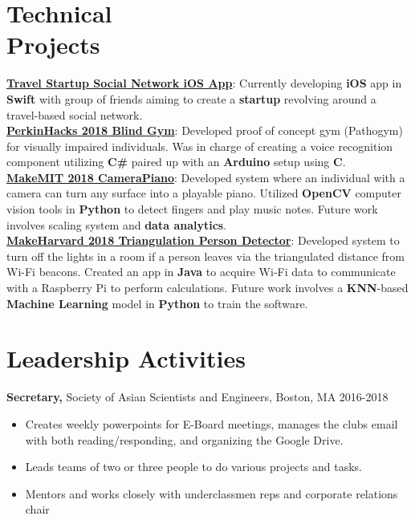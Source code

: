 \documentclass[margin]{res}
\begin{document}
\begin{resume}
\section{Technical \\ Projects} 
\textbf{\underline{Travel Startup Social Network iOS App}}: Currently developing \textbf{iOS} app in \textbf{Swift} with group of friends aiming to create a \textbf{startup} revolving around a travel-based social network. \\
\textbf{\underline{PerkinHacks 2018 Blind Gym}}: Developed proof of concept gym (Pathogym) for visually impaired individuals. Was in charge of creating a voice recognition component utilizing \textbf{C\#} paired up with an \textbf{Arduino} setup using \textbf{C}. \\
\textbf{\underline{MakeMIT 2018 CameraPiano}}: Developed system where an individual with a camera can turn any surface into a playable piano. Utilized \textbf{OpenCV} computer vision tools in \textbf{Python} to detect fingers and play music notes. Future work involves scaling system and \textbf{data analytics}.\\
\textbf{\underline{MakeHarvard 2018 Triangulation Person Detector}}: Developed system to turn off the lights in a room if a person leaves via the triangulated distance from Wi-Fi beacons. Created an app in \textbf{Java} to acquire Wi-Fi data to communicate with a Raspberry Pi to perform calculations. Future work involves a \textbf{KNN}-based \textbf{Machine Learning} model in \textbf{Python} to train the software. \\

			
			
			
			
			
\section{Leadership   Activities} 
               {\bf Secretary,} Society of Asian Scientists and Engineers, Boston, MA    \hfill         2016-2018
                \begin{itemize} \itemsep -0.5pt
                \item Creates weekly powerpoints for E-Board meetings, manages the clubs email with both reading/responding, and organizing the Google Drive.
                \item Leads teams of two or three people to do various projects and tasks.
              \item Mentors and works closely with underclassmen reps and corporate relations chair


\end{itemize}
\end{resume}
\end{document}
